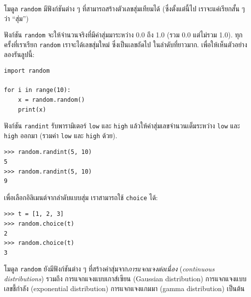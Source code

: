 โมดูล \texttt{random} มีฟังก์ชันต่าง ๆ ที่สามารถสร้างตัวเลขสุ่มเทียมได้ 
(ซึ่งตั้งแต่นี้ไป เราจะแค่เรียกสั้น ๆ ว่า ``สุ่ม'')


ฟังก์ชัน \texttt{random} จะให้จำนวนจริงที่มีค่าสุ่มมาระหว่าง 0.0 ถึง 1.0 (รวม 0.0 แต่ไม่รวม 1.0).
ทุกครั้งที่เราเรียก \texttt{random}
เราจะได้เลขสุ่มใหม่ ซึ่งเป็นเลขถัดไป ในลำดับที่ยาวมาก.
เพื่อให้เห็นตัวอย่าง ลองรันลูปนี้:

\begin{verbatim}
import random

for i in range(10):
    x = random.random()
    print(x)
\end{verbatim}
%
%
ฟังก์ชัน \texttt{randint} รับพารามิเตอร์ \texttt{low} และ \texttt{high}
แล้วให้ค่าสุ่มเลขจำนวนเต็มระหว่าง \texttt{low} และ \texttt{high} ออกมา 
(รวมค่า \texttt{low} และ \texttt{high} ด้วย).

\begin{verbatim}
>>> random.randint(5, 10)
5
>>> random.randint(5, 10)
9
\end{verbatim}
%
%
เพื่อเลือกอิลิเมนต์จากลำดับแบบสุ่ม
เราสามารถใช้ \texttt{choice} ได้:

\begin{verbatim}
>>> t = [1, 2, 3]
>>> random.choice(t)
2
>>> random.choice(t)
3
\end{verbatim}
%
%
โมดูล \texttt{random} ยังมีฟังก์ชันต่าง ๆ
ที่สร้างค่าสุ่มจาก\textit{การแจกแจงต่อเนื่อง} (\textit{continuous distributions})
รวมถึง การแจกแจงแบบเกาส์เซียน (Gaussian distribution)
การแจกแจงแบบเลขชี้กำลัง (exponential distribution)
การแจกแจงแกมมา (gamma distribution)
เป็นต้น


